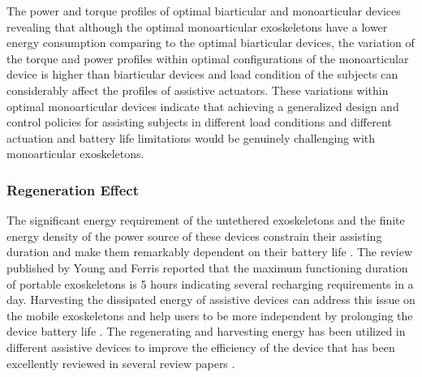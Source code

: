 \documentclass[10pt,letterpaper]{article}
\begin{document}
The power and torque profiles of optimal biarticular and monoarticular devices revealing that although the optimal monoarticular exoskeletons have a lower energy consumption comparing to the optimal biarticular devices, the variation of the torque and power profiles within optimal configurations of the monoarticular device is higher than biarticular devices and load condition of the subjects can considerably affect the profiles of assistive actuators. These variations within optimal monoarticular devices indicate that achieving a generalized design and control policies for assisting subjects in different load conditions and different actuation and battery life limitations would be genuinely challenging with monoarticular exoskeletons.\\
\subsubsection*{Regeneration Effect}
The significant energy requirement of the untethered exoskeletons and the finite energy density of the power source of these devices constrain their assisting duration and make them remarkably dependent on their battery life \cite{140}. The review published by Young and Ferris \cite {36} reported that the maximum functioning duration of portable exoskeletons is 5 hours indicating several recharging requirements in a day. Harvesting the dissipated energy of assistive devices can address this issue on the mobile exoskeletons and help users to be more independent by prolonging the device battery life \cite{140,141,142}. The regenerating and harvesting energy has been utilized in different assistive devices to improve the efficiency of the device that has been excellently reviewed in several review papers \cite{140,141,142}.\\
\end{document}
